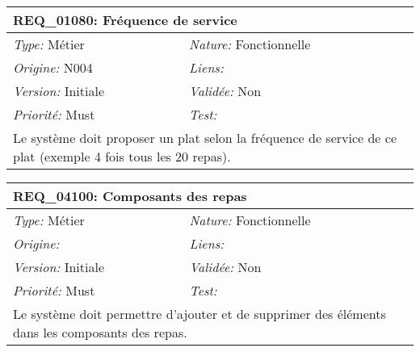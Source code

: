 \begin{table}[!ht]

\begin{tabular}{|p{60mm}p{100mm}|}

\hline

\multicolumn{2}{|l|}{\textbf{REQ\_01080:} Fréquence de service} \\ \hline

\emph{Type:} Métier & \emph{Nature:} Fonctionnelle \\

\emph{Origine:} N004 & \emph{Liens:}  \\

\emph{Version:} Initiale & \emph{Validée:} Non \\

\emph{Priorité:} Must & \emph{Test:} \\ \hline

\multicolumn{2}{|p{16cm}|}{Le système doit proposer un plat selon la fréquence de service de ce plat (exemple 4 fois tous les 20 repas).} \\ \hline

\end{tabular}

\end{table}



\begin{table}[!ht]

\begin{tabular}{|p{60mm}p{100mm}|}

\hline

\multicolumn{2}{|l|}{\textbf{REQ\_04100:} Composants des repas} \\ \hline

\emph{Type:} Métier & \emph{Nature:} Fonctionnelle \\

\emph{Origine:}  & \emph{Liens:}  \\

\emph{Version:} Initiale & \emph{Validée:} Non \\

\emph{Priorité:} Must & \emph{Test:} \\ \hline

\multicolumn{2}{|p{16cm}|}{Le système doit permettre d'ajouter et de supprimer des éléments dans les composants des repas.} \\ \hline

\end{tabular}

\end{table}



